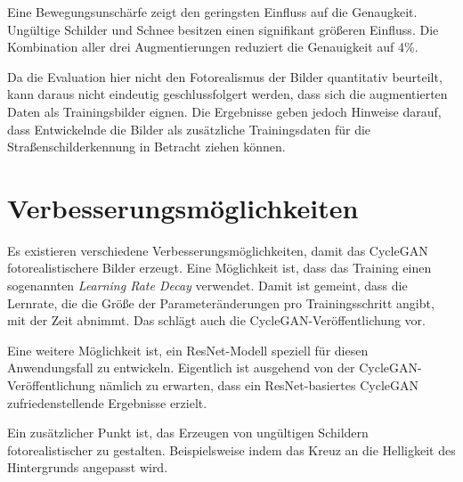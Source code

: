 Eine Bewegungsunschärfe zeigt den geringsten Einfluss auf die Genaugkeit. Ungültige Schilder und Schnee besitzen einen signifikant größeren Einfluss. Die Kombination aller drei Augmentierungen reduziert die Genauigkeit auf 4\%.

Da die Evaluation hier nicht den Fotorealismus der Bilder quantitativ beurteilt, kann daraus nicht eindeutig geschlussfolgert werden, dass sich die augmentierten Daten als Trainingsbilder eignen. Die Ergebnisse geben jedoch Hinweise darauf, dass Entwickelnde die Bilder als zusätzliche Trainingsdaten für die Straßenschilderkennung in Betracht ziehen können.

\section{Verbesserungsmöglichkeiten}

Es existieren verschiedene Verbesserungsmöglichkeiten, damit das \ac{CycleGAN} fotorealistischere Bilder erzeugt. Eine Möglichkeit ist, dass das Training einen sogenannten \emph{Learning Rate Decay} verwendet. Damit ist gemeint, dass die Lernrate, die die Größe der Parameteränderungen pro Trainingsschritt angibt, mit der Zeit abnimmt. Das schlägt auch die \ac{CycleGAN}-Veröffentlichung vor.

Eine weitere Möglichkeit ist, ein ResNet-Modell speziell für diesen Anwendungsfall zu entwickeln. Eigentlich ist ausgehend von der \ac{CycleGAN}-Veröffentlichung nämlich zu erwarten, dass ein ResNet-basiertes \ac{CycleGAN} zufriedenstellende Ergebnisse erzielt.

Ein zusätzlicher Punkt ist, das Erzeugen von ungültigen Schildern fotorealistischer zu gestalten. Beispielsweise indem das Kreuz an die Helligkeit des Hintergrunds angepasst wird.